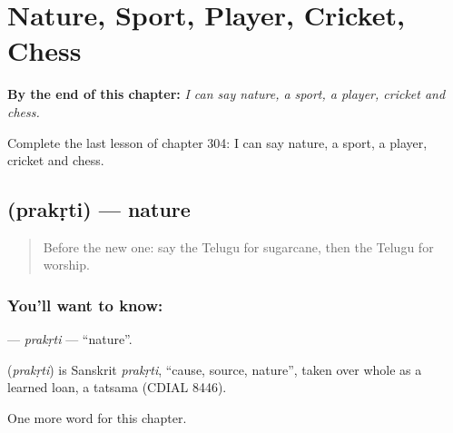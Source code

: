 
\chapter{Nature, Sport, Player, Cricket, Chess}
\label{ch:te-nature-sport-player-cricket-chess}

\begin{chapteropening}
\textbf{By the end of this chapter:} \emph{I can say nature, a sport, a player, cricket and chess.}

Complete the last lesson of chapter 304: I can say nature, a sport, a player, cricket and chess.
\end{chapteropening}

\section[\texorpdfstring{\te{ప్రకృతి} (prakṛti)}{ప్రకృతి (prakṛti)}]{ (prakṛti) — nature}

\label{lesson:TE-C304-prakrti}



\begin{quote}
Before the new one: say the Telugu for sugarcane, then the Telugu for worship.
\end{quote}

\subsection*{You'll want to know: }
\textbf{} — \emph{prakṛti} — \textquotedblleft{}nature\textquotedblright{}.

\begin{cousinweb}
\textbf{} (\emph{prakṛti}) is Sanskrit \emph{prakṛti}, \textquotedblleft{}cause, source, nature\textquotedblright{}, taken over whole as a learned loan, a tatsama (CDIAL 8446).
\end{cousinweb}

\begin{grammarlens}[title={What you've built}]
One more word for this chapter.
\end{grammarlens}

